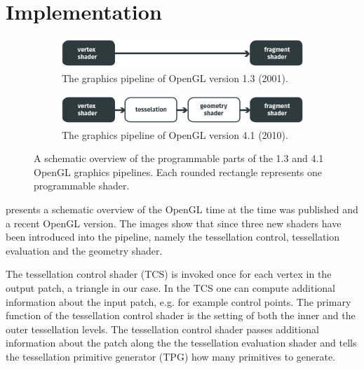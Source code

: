 
\section{Implementation}
\label{s:implementation}

\begin{figure}
	\centering
	\begin{subfigure}{\columnwidth}
		\centering
		\includegraphics[width=\columnwidth]{content/img/implementation/pipeLineOld.png}
		\caption{The graphics pipeline of OpenGL version 1.3 (2001).}
		\label{fig:implementation:pipeline:old}
	\end{subfigure}
	\begin{subfigure}{\columnwidth}
		\centering
		\includegraphics[width=\columnwidth]{content/img/implementation/pipeLineNew.png}
		\caption{The graphics pipeline of OpenGL version 4.1 (2010).}
		\label{fig:implementation:pipeline:new}
	\end{subfigure}	
	\caption{A schematic overview of the programmable parts of the  1.3 and  4.1 OpenGL graphics pipelines. Each rounded rectangle represents one programmable shader.}
	\label{fig:implementation:pipeline}
\end{figure}

 presents a schematic overview of the OpenGL time at the time \citeauthor{vlachos2001curved} was published and a recent OpenGL version. The images show that since \citeyear{vlachos2001curved} three new shaders have been introduced into the pipeline, namely the tessellation control, tessellation evaluation and the geometry shader. 


The tessellation control shader (TCS) is invoked once for each vertex in the output patch, a triangle in our case. 
In the TCS one can compute additional information about the input patch, e.g. for example control points. The primary function of the tessellation control shader is the setting of both the inner and the outer tessellation levels.
The tessellation control shader passes additional information about the patch along the the tessellation evaluation shader and tells the tessellation primitive generator (TPG) how many primitives to generate.

